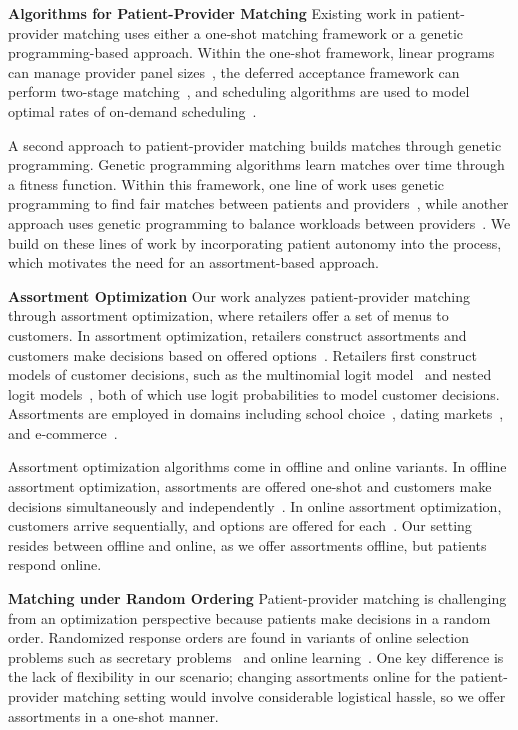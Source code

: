 \textbf{Algorithms for Patient-Provider Matching}
Existing work in patient-provider matching uses either a one-shot matching framework or a genetic programming-based approach. 
Within the one-shot framework, linear programs can manage provider panel sizes~\citep{panel_size_lp}, the deferred acceptance framework can perform two-stage matching~\citep{two_stage_matching}, and scheduling algorithms are used to model optimal rates of on-demand scheduling~\citep{on_demand_percent}. 

A second approach to patient-provider matching builds matches through genetic programming. 
Genetic programming algorithms learn matches over time through a fitness function. 
Within this framework, one line of work uses genetic programming to find fair matches between patients and providers~\citep{two_stage_matching}, while another approach uses genetic programming to balance workloads between providers~\citep{genetic_non_dominated}. 
We build on these lines of work by incorporating patient autonomy into the process, which motivates the need for an assortment-based approach. 

\textbf{Assortment Optimization} 
Our work analyzes patient-provider matching through assortment optimization, where retailers offer a set of menus to customers. 
In assortment optimization, retailers construct assortments and customers make decisions based on offered options~\citep{assortment_optimization}. 
Retailers first construct models of customer decisions, such as the multinomial logit model~\citep{assortment_mnl} and nested logit models~\citep{assortment_nested_logit}, both of which use logit probabilities to model customer decisions. 
Assortments are employed in domains including school choice~\citep{assortment_school}, dating markets~\citep{assortment_dating}, and e-commerce~\citep{e_commerce_assortment}. 

Assortment optimization algorithms come in offline and online variants. 
In offline assortment optimization, assortments are offered one-shot and customers make decisions simultaneously and independently~\citep{assortment_optimization}. 
In online assortment optimization, customers arrive sequentially, and options are offered for each~\citep{assortment_online}. 
Our setting resides between offline and online, as we offer assortments offline, but patients respond online. 

\textbf{Matching under Random Ordering} 
Patient-provider matching is challenging from an optimization perspective because patients make decisions in a random order. 
Randomized response orders are found in variants of online selection problems such as secretary problems~\citep{secretary_problem} and online learning~\citep{online_learning}. 
One key difference is the lack of flexibility in our scenario; changing assortments online for the patient-provider matching setting would involve considerable logistical hassle, so we offer assortments in a one-shot manner. 